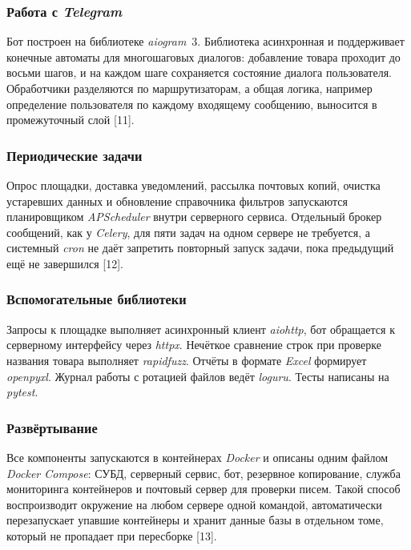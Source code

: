 \subsubsection{Работа с \textit{Telegram}}

Бот построен на библиотеке \textit{aiogram}~3. Библиотека асинхронная и поддерживает конечные автоматы для многошаговых диалогов: добавление товара проходит до восьми шагов, и на каждом шаге сохраняется состояние диалога пользователя. Обработчики разделяются по маршрутизаторам, а общая логика, например определение пользователя по каждому входящему сообщению, выносится в промежуточный слой [11].

\subsubsection{Периодические задачи}

Опрос площадки, доставка уведомлений, рассылка почтовых копий, очистка устаревших данных и обновление справочника фильтров запускаются планировщиком \textit{APScheduler} внутри серверного сервиса. Отдельный брокер сообщений, как у \textit{Celery}, для пяти задач на одном сервере не требуется, а системный \textit{cron} не даёт запретить повторный запуск задачи, пока предыдущий ещё не завершился [12].

\subsubsection{Вспомогательные библиотеки}

Запросы к площадке выполняет асинхронный клиент \textit{aiohttp}, бот обращается к серверному интерфейсу через \textit{httpx}. Нечёткое сравнение строк при проверке названия товара выполняет \textit{rapidfuzz}. Отчёты в формате \textit{Excel} формирует \textit{openpyxl}. Журнал работы с ротацией файлов ведёт \textit{loguru}. Тесты написаны на \textit{pytest}.

\subsubsection{Развёртывание}

Все компоненты запускаются в контейнерах \textit{Docker} и описаны одним файлом \textit{Docker Compose}: СУБД, серверный сервис, бот, резервное копирование, служба мониторинга контейнеров и почтовый сервер для проверки писем. Такой способ воспроизводит окружение на любом сервере одной командой, автоматически перезапускает упавшие контейнеры и хранит данные базы в отдельном томе, который не пропадает при пересборке [13].
